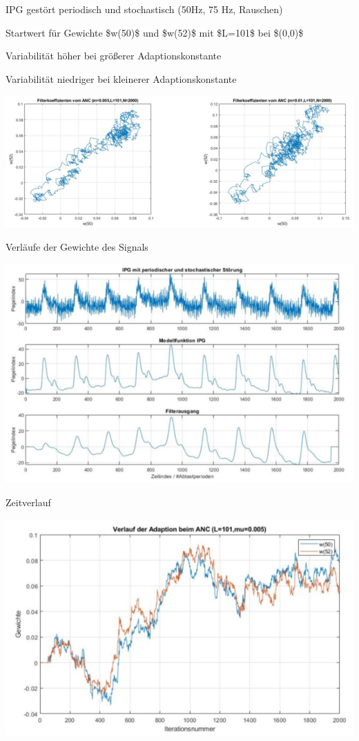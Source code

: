 \documentclass[a4paper]{article}
\begin{document}
\begin{multicols}{3}
  \begin{itemize*}
    \item IPG gestört periodisch und stochastisch (50Hz, 75 Hz, Rauschen)
    \item Startwert für Gewichte \$w(50)\$ und \$w(52)\$ mit \$L=101\$ bei \$(0,0)\$
    \item Variabilität höher bei größerer Adaptionskonstante
    \item Variabilität niedriger bei kleinerer Adaptionskonstante
    \item \includegraphics[width=.5\linewidth]{Assets/Biosignalverarbeitung-adaptiver-filter-adaption-anc.png}
    \item Verläufe der Gewichte des Signals
    \begin{itemize*}
      \item \includegraphics[width=.5\linewidth]{Assets/Biosignalverarbeitung-adaptiver-filter-reale-aufnahme.png}
    \end{itemize*}
    \item Zeitverlauf
    \begin{itemize*}
      \item \includegraphics[width=.5\linewidth]{Assets/Biosignalverarbeitung-adaptiver-filter-zeitverlauf-anc.png}
    \end{itemize*}
  \end{itemize*}


\end{multicols}
\end{document}
